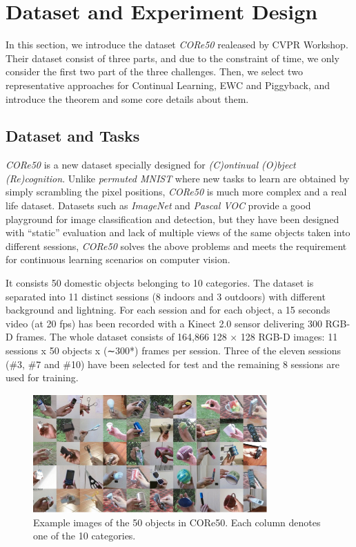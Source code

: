 \section{Dataset and Experiment Design} \label{design}
In this section, we introduce the dataset \textit{CORe50} realeased by CVPR Workshop. Their dataset consist of three parts, and due to the constraint of time, we only consider the first two part of the three challenges. Then, we select two representative approaches for Continual Learning, EWC and Piggyback, and introduce the theorem and some core details about them.

\subsection{Dataset and Tasks}
\textit{CORe50} is a new dataset specially designed for \textit{(C)ontinual (O)bject (Re)cognition}. Unlike \textit{permuted MNIST}  where new tasks to learn are obtained by simply scrambling the pixel positions, \textit{CORe50} is much more complex and a real life dataset. Datasets such as \textit{ImageNet} and \textit{Pascal VOC} provide a good playground for image classification and detection, but they have been designed with “static” evaluation and lack of multiple views of the same objects taken into different sessions, \textit{CORe50} solves the above problems and meets the requirement for continuous learning scenarios on computer vision.

It consists 50 domestic objects belonging to 10 categories. The dataset is separated into 11 distinct sessions (8 indoors and 3 outdoors) with different background and lightning. For each session and for each object, a 15 seconds video (at 20 fps) has been recorded with a Kinect 2.0 sensor delivering 300 RGB-D frames. The whole dataset consists of 164,866 128 × 128 RGB-D images: 11 sessions x 50 objects x (∼300*) frames per session.  Three of the eleven sessions (\#3, \#7 and \#10) have been selected for test and the remaining 8 sessions are used for training. 

\begin{figure}[h]
  \centering
  \captionsetup{width=0.6\textwidth}
  \includegraphics[width=0.8\textwidth]{figure/core50.png}
  \caption{Example images of the 50 objects in CORe50. Each column denotes one of the 10 categories.}
  \label{core50}
\end{figure}

